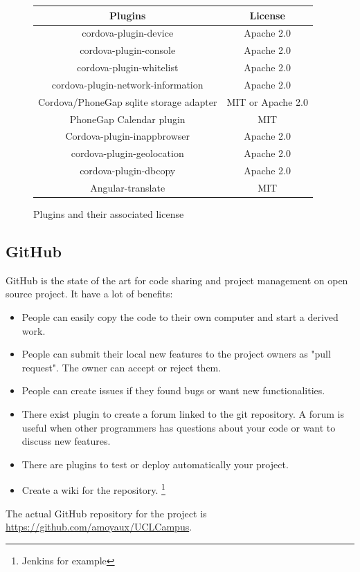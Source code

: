 \documentclass{eplmastersthesis}
\begin{document}
\begin{figure}
\begin{center}
\begin{tabular}{c|c}
Plugins & License\\
\hline
cordova-plugin-device & Apache 2.0\\
cordova-plugin-console & Apache 2.0\\
cordova-plugin-whitelist & Apache 2.0\\
cordova-plugin-network-information & Apache 2.0\\
Cordova/PhoneGap sqlite storage adapter & MIT or Apache 2.0\\
PhoneGap Calendar plugin & MIT\\
Cordova-plugin-inappbrowser & Apache 2.0\\
cordova-plugin-geolocation & Apache 2.0\\
cordova-plugin-dbcopy & Apache 2.0\\
Angular-translate & MIT \\
\end{tabular}
\end{center}
\caption{Plugins and their associated license}
\end{figure}
\subsection{GitHub}
GitHub is the state of the art for code sharing and project management on open source project. It have a lot of benefits:
\begin{itemize}
\item People can easily copy the code to their own computer and start a derived work. 
\item People can submit their local new features to the project owners as "pull request". The owner can accept or reject them.
\item People can create issues if they found bugs or want new functionalities. 
\item There exist plugin to create a forum linked to the git repository. A forum is useful when other programmers has questions about your code or want to discuss new features.
\item There are plugins to test or deploy automatically your project.
\item Create a wiki for the repository.
\footnote{Jenkins for example}
\end{itemize}
The actual GitHub repository for the project is \url{https://github.com/amoyaux/UCLCampus}.
\end{document}

